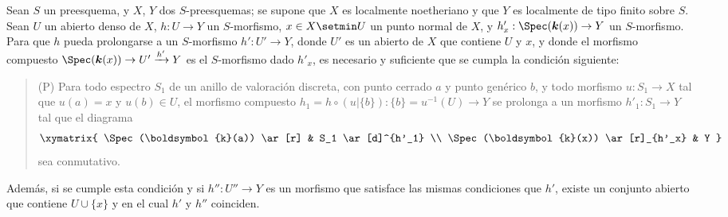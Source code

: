 \begin{proposition}[20.4.6]
\label{IV.20.4.6}
Sean $S$ un preesquema, y $X$, $Y$ dos $S$-preesquemas; se supone que $X$ es localmente noetheriano y que $Y$ es localmente de tipo finito sobre $S$.
Sean $U$ un abierto denso de $X$, $h:U\to Y$ un $S$-morfismo, $x\in X\setmin U$ un punto \textup{normal} de $X$, y $h'_x:\Spec(\boldsymbol{k}(x))\to Y$ un $S$-morfismo.
Para que $h$ pueda prolongarse a un $S$-morfismo $h':U'\to Y$, donde $U'$ es un abierto de $X$ que contiene $U$ y $x$, y donde el morfismo compuesto $\Spec(\boldsymbol{k}(x))\to U'\xrightarrow{h'}Y$ es el $S$-morfismo dado $h'_x$, es necesario y suficiente que se cumpla la condición siguiente:
\begin{quote}
\textup{(P)} Para todo espectro $S_1$ de un anillo de valoración discreta, con punto cerrado $a$ y punto genérico $b$, y todo morfismo $u:S_1\to X$ tal que $u(a)=x$ y $u(b)\in U$, el morfismo compuesto $h_1=h\circ(u|\{b\}):\{b\}=u^{-1}(U)\to Y$ se prolonga a un morfismo $h'_1:S_1\to Y$ tal que el diagrama
\[
  \xymatrix{
  \Spec(\boldsymbol{k}(a)) \ar[r] & S_1 \ar[d]^{h'_1} \\
  \Spec(\boldsymbol{k}(x)) \ar[r]_{h'_x} & Y
  }
\]
sea conmutativo.
\end{quote}
Además, si se cumple esta condición y si $h'':U''\to Y$ es un morfismo que satisface las mismas condiciones que $h'$, existe un conjunto abierto que contiene $U\cup\{x\}$ y en el cual $h'$ y $h''$ coinciden.
\end{proposition}

